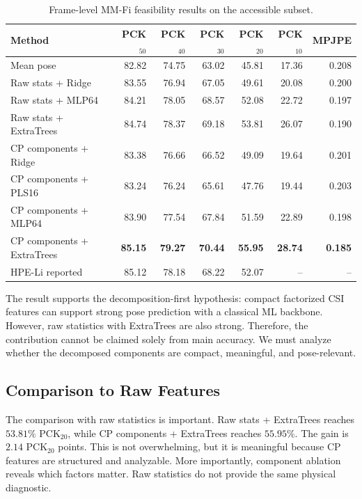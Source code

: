 \documentclass[letterpaper]{article}
\begin{document}
\begin{table}[t]
\centering
\caption{Frame-level MM-Fi feasibility results on the accessible subset.}
\label{tab:main_results}
\begin{tabular}{lrrrrrr}
\toprule
Method & PCK$_{50}$ & PCK$_{40}$ & PCK$_{30}$ & PCK$_{20}$ & PCK$_{10}$ & MPJPE \\
\midrule
Mean pose & 82.82 & 74.75 & 63.02 & 45.81 & 17.36 & 0.208 \\
Raw stats + Ridge & 83.55 & 76.94 & 67.05 & 49.61 & 20.08 & 0.200 \\
Raw stats + MLP64 & 84.21 & 78.05 & 68.57 & 52.08 & 22.72 & 0.197 \\
Raw stats + ExtraTrees & 84.74 & 78.37 & 69.18 & 53.81 & 26.07 & 0.190 \\
CP components + Ridge & 83.38 & 76.66 & 66.52 & 49.09 & 19.64 & 0.201 \\
CP components + PLS16 & 83.24 & 76.24 & 65.61 & 47.76 & 19.44 & 0.203 \\
CP components + MLP64 & 83.90 & 77.54 & 67.84 & 51.59 & 22.89 & 0.198 \\
CP components + ExtraTrees & \textbf{85.15} & \textbf{79.27} & \textbf{70.44} & \textbf{55.95} & \textbf{28.74} & \textbf{0.185} \\
HPE-Li reported & 85.12 & 78.18 & 68.22 & 52.07 & -- & -- \\
\bottomrule
\end{tabular}
\end{table}

The result supports the decomposition-first hypothesis: compact factorized CSI features can support strong pose prediction with a classical ML backbone. However, raw statistics with ExtraTrees are also strong. Therefore, the contribution cannot be claimed solely from main accuracy. We must analyze whether the decomposed components are compact, meaningful, and pose-relevant.

\subsection{Comparison to Raw Features}

The comparison with raw statistics is important. Raw stats + ExtraTrees reaches $53.81\%$ PCK$_{20}$, while CP components + ExtraTrees reaches $55.95\%$. The gain is $2.14$ PCK$_{20}$ points. This is not overwhelming, but it is meaningful because CP features are structured and analyzable. More importantly, component ablation reveals which factors matter. Raw statistics do not provide the same physical diagnostic.
\end{document}
